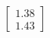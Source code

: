 \documentclass[preview]{standalone}
\begin{document}
\begin{align*}
\begin{bmatrix} 1.38 \\ 1.43 \end{bmatrix}
\end{align*}
\end{document}
